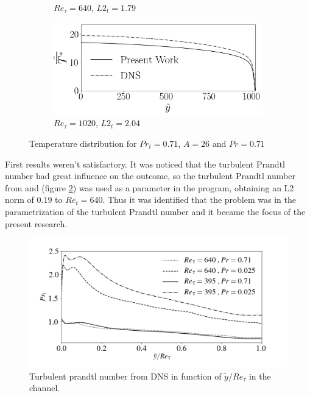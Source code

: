 \documentclass[10pt]{article} %
\begin{document}
\begin{figure}[h!]
\begin{subfigure}[t]{0.49\textwidth}
		\caption{$Re_\tau = 640$, $L2_t = 1.79$}
		\end{subfigure}%
		\begin{subfigure}[t]{0.49\textwidth}
		\centering
 		\includegraphics[angle=0, scale=0.24]{fotos_formatacao_final/Temperature_1000_071_classico}
		\caption{$Re_\tau = 1020$, $L2_t = 2.04$}
		\end{subfigure}%
		\caption{Temperature distribution for $Pr_t = 0.71$, $A = 26$ and $Pr = 0.71$} 
		\label{figuraresultados1}
	\end{figure}	

First results weren't satisfactory. It was noticed that the turbulent Prandtl number had great influence on the outcome, so the turbulent Prandtl number from \cite{DNS1020} and \cite{DNS150} (figure \ref{figure5}) was used as a parameter in the program, obtaining an L2 norm of $ 0.19 $ to $ Re_t = 640 $. Thus it was identified that the problem was in the parametrization of the turbulent Prandtl number and it became the focus of the present research.

\begin{figure}[h!]
	\centering
	\includegraphics[angle=0, scale=0.48]{fotos_formatacao_final/DNS_PRt}
	\caption{Turbulent prandtl number from DNS in function of $ \tilde{y}/Re_\tau $ in the channel.}
	\label{figure5}
\end{figure}
\end{document}
